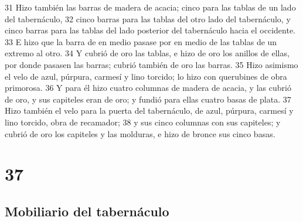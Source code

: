 31 Hizo también las barras de madera de acacia; cinco para las tablas de un lado del tabernáculo,
32 cinco barras para las tablas del otro lado del tabernáculo, y cinco barras para las tablas del lado posterior del tabernáculo hacia el occidente.
33 E hizo que la barra de en medio pasase por en medio de las tablas de un extremo al otro.
34 Y cubrió de oro las tablas, e hizo de oro los anillos de ellas, por donde pasasen las barras; cubrió también de oro las barras.
35 Hizo asimismo el velo de azul, púrpura, carmesí y lino torcido; lo hizo con querubines de obra primorosa.
36 Y para él hizo cuatro columnas de madera de acacia, y las cubrió de oro, y sus capiteles eran de oro; y fundió para ellas cuatro basas de plata.
37 Hizo también el velo para la puerta del tabernáculo, de azul, púrpura, carmesí y lino torcido, obra de recamador;
38 y sus cinco columnas con sus capiteles; y cubrió de oro los capiteles y las molduras, e hizo de bronce sus cinco basas.

\chapter{37}

\section*{Mobiliario del tabernáculo}

